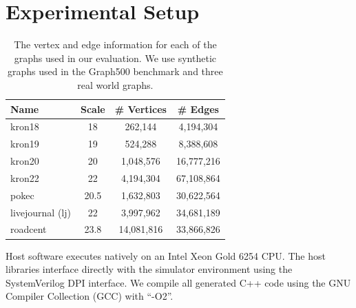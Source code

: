 %


\section{Experimental Setup}

\begin{table}[]
    \centering
    \begin{footnotesize}
    \begin{tabular}{lccc}
    \toprule
     \textbf{Name} & \textbf{Scale} & \textbf{\# Vertices} & \textbf{\# Edges} \\ \midrule %
     kron18 & 18 & 262,144 & 4,194,304 \\ %
     kron19 & 19 & 524,288 & 8,388,608 \\
     kron20 & 20 & 1,048,576 & 16,777,216 \\ %
     kron22 & 22 & 4,194,304 & 67,108,864 \\ %
     pokec & 20.5 & 1,632,803 & 30,622,564 \\ %
     livejournal (lj) & 22 & 3,997,962 & 34,681,189 \\ %
     roadcent & 23.8 & 14,081,816 & 33,866,826 \\
     \bottomrule
    \end{tabular}
    \end{footnotesize}
    \caption{The vertex and edge information for each of the graphs used in our evaluation. We use synthetic \kron graphs used in the Graph500 benchmark and three real world graphs.}
    \label{sec:eval:tab:graphs}
\end{table}

Host software executes natively on an Intel Xeon Gold 6254 CPU.
The host libraries interface directly with the simulator environment using the SystemVerilog DPI interface.
We compile all generated C++ code using the GNU Compiler Collection (GCC) with ``-O2''.

